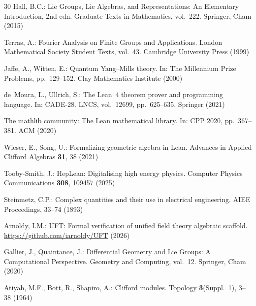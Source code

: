 \documentclass[11pt]{article}
\begin{document}
\begin{thebibliography}{30}
Hall, B.C.:
Lie Groups, Lie Algebras, and Representations: An Elementary
Introduction, 2nd edn.
Graduate Texts in Mathematics, vol.~222. Springer, Cham (2015)

Terras, A.:
Fourier Analysis on Finite Groups and Applications.
London Mathematical Society Student Texts, vol.~43. Cambridge University
Press (1999)

Jaffe, A., Witten, E.:
Quantum Yang--Mills theory.
In: The Millennium Prize Problems, pp.~129--152. Clay Mathematics
Institute (2000)

de~Moura, L., Ullrich, S.:
The Lean~4 theorem prover and programming language.
In: CADE-28. LNCS, vol.~12699, pp.~625--635. Springer (2021)

The mathlib community:
The Lean mathematical library.
In: CPP 2020, pp.~367--381. ACM (2020)

Wieser, E., Song, U.:
Formalizing geometric algebra in Lean.
Advances in Applied Clifford Algebras \textbf{31}, 38 (2021)

Tooby-Smith, J.:
HepLean: Digitalising high energy physics.
Computer Physics Communications \textbf{308}, 109457 (2025)

Steinmetz, C.P.:
Complex quantities and their use in electrical engineering.
AIEE Proceedings, 33--74 (1893)

Arnoldy, I.M.:
UFT: Formal verification of unified field theory algebraic scaffold.
\url{https://github.com/iarnoldy/UFT} (2026)

Gallier, J., Quaintance, J.:
Differential Geometry and Lie Groups: A Computational Perspective.
Geometry and Computing, vol.~12. Springer, Cham (2020)

Atiyah, M.F., Bott, R., Shapiro, A.:
Clifford modules.
Topology \textbf{3}(Suppl.~1), 3--38 (1964)

\end{thebibliography}
\end{document}

